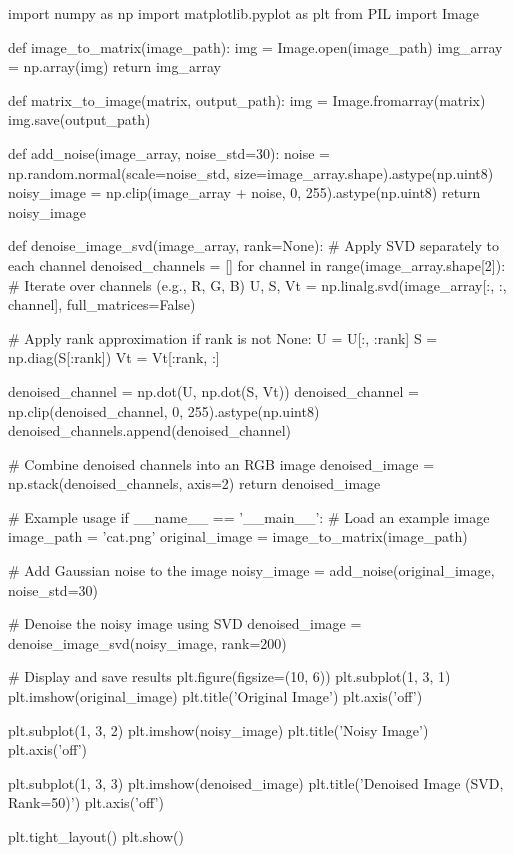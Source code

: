 \begin{latin}
  \begin{python}
import numpy as np
import matplotlib.pyplot as plt
from PIL import Image

def image_to_matrix(image_path):
    img = Image.open(image_path)
    img_array = np.array(img)
    return img_array

def matrix_to_image(matrix, output_path):
    img = Image.fromarray(matrix)
    img.save(output_path)

def add_noise(image_array, noise_std=30):
    noise = np.random.normal(scale=noise_std, size=image_array.shape).astype(np.uint8)
    noisy_image = np.clip(image_array + noise, 0, 255).astype(np.uint8)
    return noisy_image

def denoise_image_svd(image_array, rank=None):
    # Apply SVD separately to each channel
    denoised_channels = []
    for channel in range(image_array.shape[2]):  # Iterate over channels (e.g., R, G, B)
        U, S, Vt = np.linalg.svd(image_array[:, :, channel], full_matrices=False)

        # Apply rank approximation
        if rank is not None:
            U = U[:, :rank]
            S = np.diag(S[:rank])
            Vt = Vt[:rank, :]

        denoised_channel = np.dot(U, np.dot(S, Vt))
        denoised_channel = np.clip(denoised_channel, 0, 255).astype(np.uint8)
        denoised_channels.append(denoised_channel)

    # Combine denoised channels into an RGB image
    denoised_image = np.stack(denoised_channels, axis=2)
    return denoised_image

# Example usage
if __name__ == '__main__':
    # Load an example image
    image_path = 'cat.png'
    original_image = image_to_matrix(image_path)

    # Add Gaussian noise to the image
    noisy_image = add_noise(original_image, noise_std=30)

    # Denoise the noisy image using SVD
    denoised_image = denoise_image_svd(noisy_image, rank=200)

    # Display and save results
    plt.figure(figsize=(10, 6))
    plt.subplot(1, 3, 1)
    plt.imshow(original_image)
    plt.title('Original Image')
    plt.axis('off')

    plt.subplot(1, 3, 2)
    plt.imshow(noisy_image)
    plt.title('Noisy Image')
    plt.axis('off')

    plt.subplot(1, 3, 3)
    plt.imshow(denoised_image)
    plt.title('Denoised Image (SVD, Rank=50)')
    plt.axis('off')

    plt.tight_layout()
    plt.show()

  \end{python}
\end{latin}

